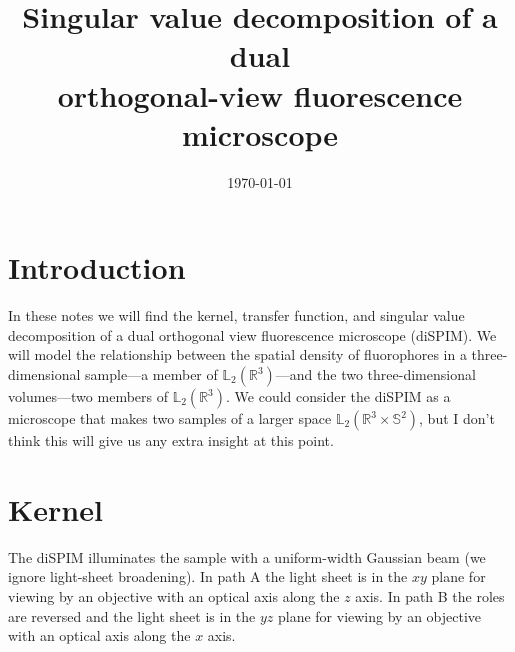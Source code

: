 \documentclass[11pt]{article}
\providecommand{\mbb}[1]{\mathbb{#1}}
\begin{document}
\title{\vspace{-2.5em} Singular value decomposition of a dual\\ orthogonal-view
  fluorescence microscope\vspace{-1em}} %
\date{\vspace{-3em}\today\vspace{-1em}}
\maketitle
\section{Introduction}
In these notes we will find the kernel, transfer function, and singular value
decomposition of a dual orthogonal view fluorescence microscope (diSPIM). We
will model the relationship between the spatial density of fluorophores in a
three-dimensional sample---a member of $\mbb{L}_2(\mbb{R}^3)$---and the two
three-dimensional volumes---two members of $\mbb{L}_2(\mbb{R}^3)$. We could
consider the diSPIM as a microscope that makes two samples of a larger space
$\mbb{L}_2(\mbb{R}^3 \times \mbb{S}^2)$, but I don't think this will give us any
extra insight at this point.

\section{Kernel}
The diSPIM illuminates the sample with a uniform-width Gaussian beam (we ignore
light-sheet broadening). In path A the light sheet is in the $xy$ plane for
viewing by an objective with an optical axis along the $z$ axis. In path B the
roles are reversed and the light sheet is in the $yz$ plane for viewing by an
objective with an optical axis along the $x$ axis.
\end{document}
